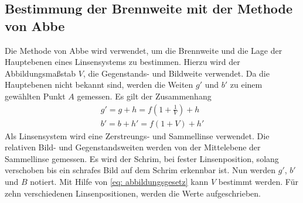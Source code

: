 \subsection{Bestimmung der Brennweite mit der Methode von Abbe}
Die Methode von Abbe wird verwendet, um die Brennweite und die Lage der Hauptebenen
eines Linsensystems zu bestimmen. Hierzu wird der Abbildungsmaßstab $V$,
die Gegenstands- und Bildweite verwendet. Da die Hauptebenen nicht bekannt sind,
werden die Weiten $g'$ und $b'$ zu einem gewählten Punkt $A$ gemessen. Es gilt der Zusammenhang
\begin{align}
    g'=g+h=f\left(1+\frac{1}{V}\right)+h \label{eq: abstaende_abbe_g} \\
    b'=b+h'=f\left(1+V\right)+h' \label{eq: abstaende_abbe_b}
\end{align}
Als Linsensystem wird eine Zerstreungs- und Sammellinse verwendet.
Die relativen Bild- und Gegenstandsweiten werden von der Mittelebene
der Sammellinse gemessen.
Es wird der Schrim, bei fester Linsenposition, solang verschoben bis ein schrafes
Bild auf dem Schrim erkennbar ist. Nun werden $g'$, $b'$ und $B$ notiert.
Mit Hilfe von \eqref{eq: abbildungsgesetz} kann $V$ bestimmt werden.
Für zehn verschiedenen Linsenpositionen, werden die Werte aufgeschrieben.
